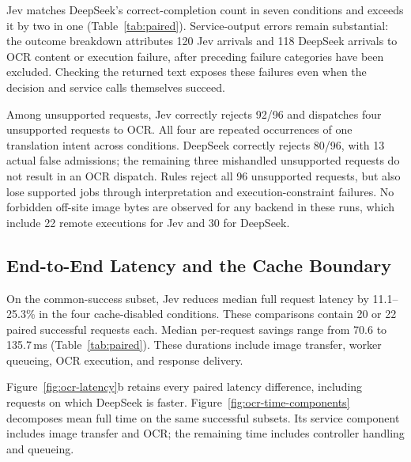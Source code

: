 Jev matches DeepSeek's correct-completion count in seven conditions and
exceeds it by two in one (Table~\ref{tab:paired}). Service-output errors
remain substantial: the outcome breakdown
attributes 120 Jev arrivals and 118 DeepSeek arrivals to OCR content or
execution failure, after preceding failure categories have been excluded.
Checking the returned text exposes these failures even when the decision
and service calls themselves succeed.

Among unsupported requests, Jev correctly rejects
92/96 and dispatches four unsupported requests to OCR. All four are repeated
occurrences of one translation intent across conditions. DeepSeek correctly
rejects 80/96, with 13 actual false
admissions; the remaining three mishandled unsupported requests do not result
in an OCR dispatch. Rules reject all 96 unsupported requests, but also lose
supported jobs through interpretation and execution-constraint failures.
No forbidden off-site image bytes are observed for any backend in these
runs, which include 22 remote executions for Jev and 30 for DeepSeek.

\begin{table}[!t]
\caption{Study B: all Jev--DeepSeek paired conditions. Each condition has 48
arrivals, of which 36 require OCR. Completion counts retain all failures;
latencies use only the $N$ requests completed correctly by both backends.
Positive paired saving means faster completion with Jev.}
\label{tab:paired}
\centering

\end{table}

\subsection{End-to-End Latency and the Cache Boundary}

On the common-success subset, Jev reduces median full request latency by
11.1--25.3\% in the four cache-disabled conditions. These comparisons contain
20 or 22 paired successful requests each. Median per-request savings range
from 70.6 to 135.7\,ms (Table~\ref{tab:paired}). These durations include
image transfer, worker queueing, OCR execution, and response delivery.



Figure~\ref{fig:ocr-latency}b retains every paired latency difference, including
requests on which DeepSeek is faster. Figure~\ref{fig:ocr-time-components}
decomposes mean full time on the same successful subsets. Its service component includes
image transfer and OCR; the remaining time includes controller handling and
queueing.

